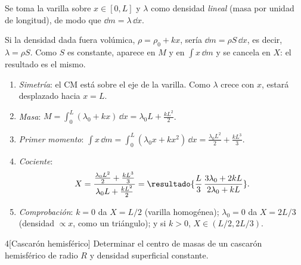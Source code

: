 \begin{resolucion}
Se toma la varilla sobre $x\in[0,L]$ y $\lambda$ como densidad \emph{lineal}
(masa por unidad de longitud), de modo que $\dd m=\lambda\,\dd x$.
\begin{observacion}[¿Y la sección $S$?]
Si la densidad dada fuera volúmica, $\rho=\rho_{0}+kx$, sería $\dd m=\rho S\,\dd x$, es
decir, $\lambda=\rho S$. Como $S$ es constante, aparece en $M$ y en $\int x\,\dd m$ y se
cancela en $X$: el resultado es el mismo.
\end{observacion}
\begin{enumerate}
  \item \emph{Simetría}: el CM está sobre el eje de la varilla. Como $\lambda$
  crece con $x$, estará desplazado hacia $x=L$.
  \item \emph{Masa}:
  $M=\displaystyle\int_{0}^{L}(\lambda_{0}+kx)\,\dd x=\lambda_{0}L+\frac{kL^{2}}{2}$.
  \item \emph{Primer momento}:
  $\displaystyle\int x\,\dd m=\int_{0}^{L}(\lambda_{0}x+kx^{2})\,\dd x=\frac{\lambda_{0}L^{2}}{2}+\frac{kL^{3}}{3}$.
  \item \emph{Cociente}:
  \[
    X=\frac{\tfrac{\lambda_{0}L^{2}}{2}+\tfrac{kL^{3}}{3}}{\lambda_{0}L+\tfrac{kL^{2}}{2}}
    =\resultado{\frac{L}{3}\,\frac{3\lambda_{0}+2kL}{2\lambda_{0}+kL}} .
  \]
  \item \emph{Comprobación}: $k=0$ da $X=L/2$ (varilla homogénea); $\lambda_{0}=0$
  da $X=2L/3$ (densidad $\propto x$, como un triángulo); y si $k>0$, $X\in(L/2,2L/3)$.\qedhere
\end{enumerate}
\end{resolucion}

\begin{problema}{4}[Cascarón hemisférico]
\label{prob:4}
Determinar el centro de masas de un cascarón hemisférico de radio $R$ y
densidad superficial constante.
\end{problema}

